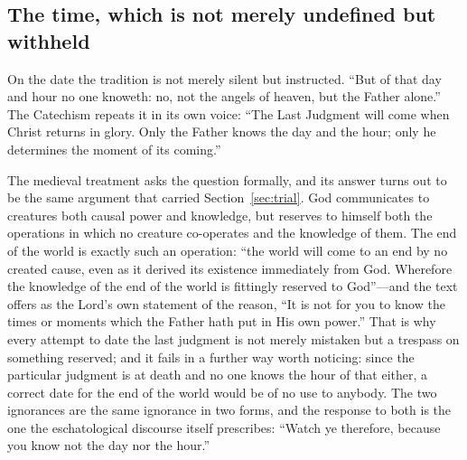 \subsection{The time, which is not merely undefined but withheld}

On the date the tradition is not merely silent but instructed. ``But of that day and hour no one knoweth: no, not the angels of heaven, but the Father alone.'' The Catechism repeats it in its own voice: ``The Last Judgment will come when Christ returns in glory. Only the Father knows the day and the hour; only he determines the moment of its coming.''

The medieval treatment asks the question formally, and its answer turns out to be the same argument that carried Section~\ref{sec:trial}. God communicates to creatures both causal power and knowledge, but reserves to himself both the operations in which no creature co-operates and the knowledge of them. The end of the world is exactly such an operation: ``the world will come to an end by no created cause, even as it derived its existence immediately from God. Wherefore the knowledge of the end of the world is fittingly reserved to God''---and the text offers as the Lord's own statement of the reason, ``It is not for you to know the times or moments which the Father hath put in His own power.'' That is why every attempt to date the last judgment is not merely mistaken but a trespass on something reserved; and it fails in a further way worth noticing: since the particular judgment is at death and no one knows the hour of that either, a correct date for the end of the world would be of no use to anybody. The two ignorances are the same ignorance in two forms, and the response to both is the one the eschatological discourse itself prescribes: ``Watch ye therefore, because you know not the day nor the hour.''

